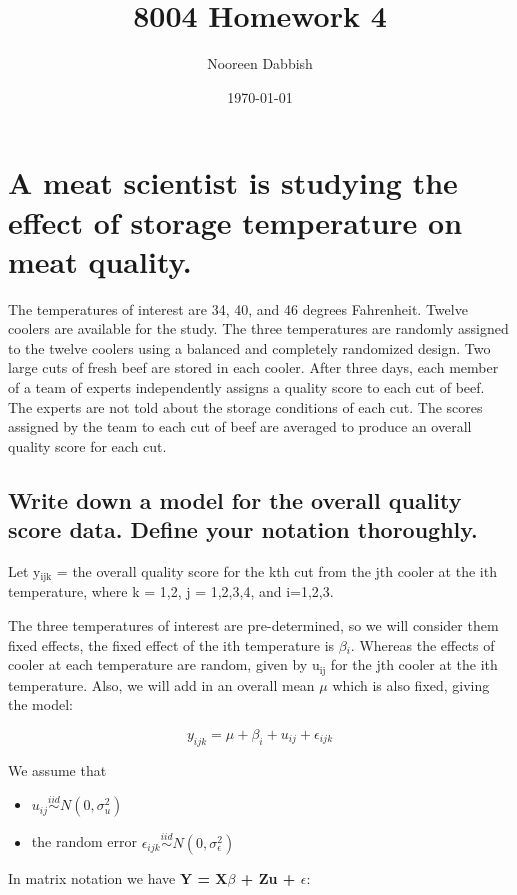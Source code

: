 \documentclass[11pt]{article}
\title{8004 Homework 4}
\author{Nooreen Dabbish}
\date{\today}
\begin{document}
\maketitle




\section{A meat scientist is studying the effect of storage temperature on meat quality.}
\label{sec-1}

The temperatures of interest are 34, 40, and 46 degrees Fahrenheit. Twelve coolers are available for the study. The three temperatures are randomly assigned to the twelve coolers using a balanced and completely randomized design. Two large cuts of fresh beef are stored in each cooler. After three days, each member of a team of experts independently assigns a quality score to each cut of beef. The experts are not told about the storage conditions of each cut. The scores assigned by the team to each cut of beef are averaged to produce an overall quality score for each cut.
\subsection{Write down a model for the overall quality score data. Define your notation thoroughly.}
\label{sec-1-1}


Let y$_{\mathrm{ijk}}$ = the overall quality score for the kth cut from the jth
cooler at the ith temperature, where k = 1,2, j = 1,2,3,4, and
i=1,2,3.

The three temperatures of interest are pre-determined, so we will
consider them fixed effects, the fixed effect of the ith temperature
is $\beta$$_i$. Whereas the effects of cooler at each temperature are
random, given by u$_{\mathrm{ij}}$ for the jth cooler at the ith temperature.
Also, we will add in an overall mean $\mu$ which is also fixed,
giving the model: 

$$y_{ijk} = \mu + \beta_i + u_{ij} + \epsilon_{ijk}$$

We assume that 
\begin{itemize}
\item $u_{ij}\overset{iid}\sim N(0,\sigma^2_u)$
\item the random error $\epsilon_{ijk}\overset{iid}\sim
   N(0,\sigma^2_\epsilon)$
\end{itemize}

In matrix notation we have \textbf{Y = X$\beta$ + Zu + $\epsilon$}:
\end{document}
